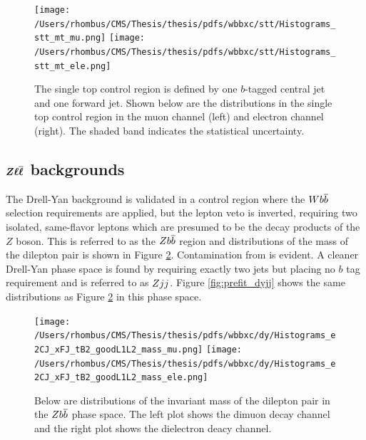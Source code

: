 \begin{figure}
      \caption[Single-top control region for the \wbb measurement]{The single top control region is defined by one $b$-tagged central jet and one forward jet.
      Shown below are the \mt distributions in the single top control region
       in the muon channel (left) and electron channel (right).
      The shaded band indicates the statistical uncertainty.
      }
\center
 \texttt{[image: /Users/rhombus/CMS/Thesis/thesis/pdfs/wbbxc/stt/Histograms\_stt\_mt\_mu.png]} 
 \texttt{[image: /Users/rhombus/CMS/Thesis/thesis/pdfs/wbbxc/stt/Histograms\_stt\_mt\_ele.png]}
      \label{fig:prefit_stt}
\end{figure}


\subsection[\zll backgrounds]{$\boldsymbol{Z\ell\overline{\ell}}$ backgrounds}

The Drell-Yan background is validated in a control region where the $W b\overline{b}$
 selection requirements are applied, but the lepton veto 
 is inverted, requiring two isolated, same-flavor leptons
 which are presumed to be the decay products of the $Z$ boson.
This is referred to as the $Z b\overline{b}$ region and distributions
 of the mass of the dilepton pair is
 shown in Figure \ref{fig:prefit_dybb}.
Contamination from \ttbar is evident. 
A cleaner Drell-Yan phase space is found by requiring exactly two jets
 but placing no $b$ tag requirement and is referred to as $Z jj$.
Figure \ref{fig:prefit_dyjj} shows the same distributions as
 Figure \ref{fig:prefit_dybb} in this phase space.

\begin{figure}
      \caption[\zbb control region for the \wbb analysis]{ 
       Below are distributions of the invariant mass
        of the dilepton pair in the
        $Z b\overline{b}$ phase space.
       The left plot shows the dimuon decay channel
        and the right plot shows the dielectron deacy channel.
      }
      \center
\texttt{[image: /Users/rhombus/CMS/Thesis/thesis/pdfs/wbbxc/dy/Histograms\_e2CJ\_xFJ\_tB2\_goodL1L2\_mass\_mu.png]}
\texttt{[image: /Users/rhombus/CMS/Thesis/thesis/pdfs/wbbxc/dy/Histograms\_e2CJ\_xFJ\_tB2\_goodL1L2\_mass\_ele.png]}
      \label{fig:prefit_dybb}
\end{figure}

